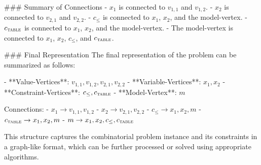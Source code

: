 ### Summary of Connections
- \( x_1 \) is connected to \( v_{1,1} \) and \( v_{1,2} \).
- \( x_2 \) is connected to \( v_{2,1} \) and \( v_{2,2} \).
- \( c_{\leq} \) is connected to \( x_1 \), \( x_2 \), and the model-vertex.
- \( c_{\textsc{table}} \) is connected to \( x_1 \), \( x_2 \), and the model-vertex.
- The model-vertex is connected to \( x_1 \), \( x_2 \), \( c_{\leq} \), and \( c_{\textsc{table}} \).

### Final Representation
The final representation of the problem can be summarized as follows:

- **Value-Vertices**: \( v_{1,1}, v_{1,2}, v_{2,1}, v_{2,2} \)
- **Variable-Vertices**: \( x_1, x_2 \)
- **Constraint-Vertices**: \( c_{\leq}, c_{\textsc{table}} \)
- **Model-Vertex**: \( m \)

Connections:
- \( x_1 \rightarrow v_{1,1}, v_{1,2} \)
- \( x_2 \rightarrow v_{2,1}, v_{2,2} \)
- \( c_{\leq} \rightarrow x_1, x_2, m \)
- \( c_{\textsc{table}} \rightarrow x_1, x_2, m \)
- \( m \rightarrow x_1, x_2, c_{\leq}, c_{\textsc{table}} \)

This structure captures the combinatorial problem instance and its constraints in a graph-like format, which can be further processed or solved using appropriate algorithms.